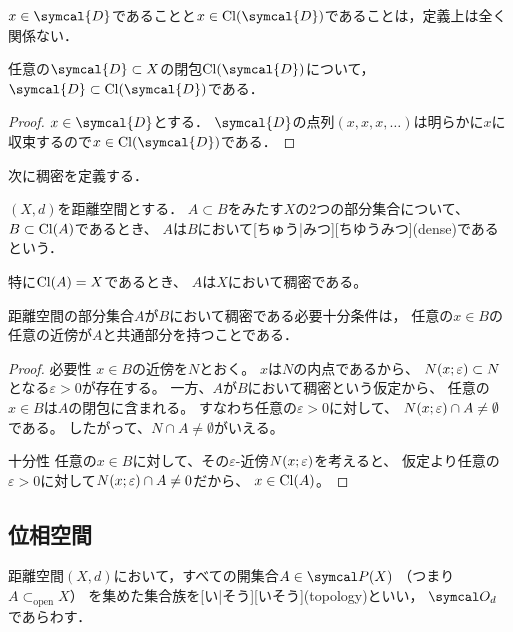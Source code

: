 \documentclass[../sotsu.tex]{subfiles}
\begin{document}
$x \in \symcal{D}$であることと$x \in \cl{\symcal{D}}$であることは，定義上は全く関係ない．

\begin{corollary}
    任意の$\symcal{D} \subset X$の閉包$\cl{\symcal{D}}$について，
    $\symcal{D} \subset \cl{\symcal{D}}$である．
\end{corollary}

\begin{proof}
    $x \in \symcal{D}$とする．
    $\symcal{D}$の点列$(x, x, x, \dotsc)$は明らかに$x$に収束するので$x \in \cl{\symcal{D}}$である．
\end{proof}

次に稠密を定義する．

\begin{definition}[稠密]
    $(X, d)$を距離空間とする．
    $A \subset B$をみたす$X$の2つの部分集合について、
    $B \subset \mathrm{Cl}(A)$であるとき、
    $A$は$B$において[ちゅう|みつ][ちゆうみつ](dense)であるという\cite{iwanami-functional}．

    特に$\mathrm{Cl}(A) = X$であるとき、
    $A$は$X$において稠密である。
\end{definition}

\begin{proposition}
    距離空間の部分集合$A$が$B$において稠密である必要十分条件は，
    任意の$x \in B$の任意の近傍が$A$と共通部分を持つことである\cite{iwanami-functional}．
\end{proposition}

\begin{proof}
    \textsf{必要性} \quad 
    $x \in B$の近傍を$N$とおく。
    $x$は$N$の内点であるから、
    $N(x; \varepsilon) \subset N$となる$\varepsilon > 0$が存在する。
    一方、$A$が$B$において稠密という仮定から、
    任意の$x \in B$は$A$の閉包に含まれる。
    すなわち任意の$\varepsilon > 0$に対して、
    $N(x; \varepsilon) \cap A \neq \emptyset$である。
    したがって、$N \cap A \neq \emptyset$がいえる。

    \textsf{十分性} \quad 
    任意の$x \in B$に対して、その$\varepsilon$-近傍$N(x; \varepsilon)$を考えると、
    仮定より任意の$\varepsilon > 0$に対して$N(x; \varepsilon) \cap A \neq 0$だから、
    $x \in \mathrm{Cl}(A)$。
\end{proof}


\subsection{位相空間}

\begin{definition}
    \label{dfn:topology}
    距離空間$(X, d)$において，すべての開集合$A \in \pset(X)$
    （つまり$A \subset_{\text{open}} X$）
    を集めた集合族を[い|そう][いそう](topology)といい，
    $\topology_d$であらわす．
\end{definition}
\end{document}

